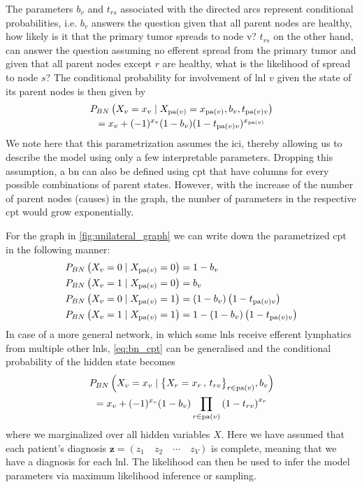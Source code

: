 \documentclass[\relativeRoot/main.tex]{subfiles}
\begin{document}
The parameters $b_v$ and $t_{rs}$   associated with the directed arcs represent conditional probabilities, i.e. $b_v$ answers the question given that all parent nodes are healthy, how likely is it that the primary tumor spreads to node v? $t_{rs}$ on the other hand, can answer the question assuming no efferent spread from the primary tumor and given that all parent nodes except $r$ are healthy, what is the likelihood of spread to node $s$? The conditional probability for involvement of \gls{lnl} $v$ given the state of its parent nodes is then given by
%
\begin{multline}
    P_{BN} \left( X_v = x_v \mid X_{\operatorname{pa}(v)} = x_{\operatorname{pa}(v)}, b_v, t_{\operatorname{pa}(v)v} \right) \\
    = x_v + (-1)^{x_v} (1 - b_v) (1 - t_{\operatorname{pa}(v)v})^{x_{\operatorname{pa}(v)}}
\end{multline}
%
We note here that this parametrization assumes the \gls{ici}, thereby allowing us to describe the model using only a few interpretable parameters. Dropping this assumption, a \gls{bn} can also be defined using \gls{cpt} that have columns for every possible combinations of parent states. However, with the increase of the number of parent nodes (causes) in the graph, the number of parameters in the respective \gls{cpt} would grow exponentially.

For the graph in \cref{fig:unilateral_graph} we can write down the parametrized \gls{cpt} in the following manner:
%
\begin{equation} \label{eq:bn_cpt}
    \begin{aligned}
        P_{BN} \left( X_v = 0 \mid X_{\operatorname{pa}(v)} = 0 \right) &= 1 - b_v \\
        P_{BN} \left( X_v = 1 \mid X_{\operatorname{pa}(v)} = 0 \right) &= b_v \\
        P_{BN} \left( X_v = 0 \mid X_{\operatorname{pa}(v)} = 1 \right) &= (1 - b_v) \left(1 - t_{\operatorname{pa}(v)v}\right) \\
        P_{BN} \left( X_v = 1 \mid X_{\operatorname{pa}(v)} = 1 \right) &= 1 - (1 - b_v) \left(1 - t_{\operatorname{pa}(v)v}\right) 
    \end{aligned}
\end{equation}
%
In case of a more general network, in which some \glspl{lnl} receive efferent lymphatics from multiple other \glspl{lnl}, \cref{eq:bn_cpt} can be generalised and the conditional probability of the hidden state becomes
%
\begin{multline}
    P_{BN} \left( X_v = x_v \mid \big\{ X_r = x_r \,,\, t_{rv} \big\}_{r \in \operatorname{pa}(v)} , b_v \right) \\
    = x_v + (-1)^{x_v} (1 - b_v) \prod_{r \in \operatorname{pa}(v)}{\left( 1 - t_{rv} \right)}^{x_r}
\end{multline}
%
where we marginalized over all hidden variables $X$. Here we have assumed that each patient's diagnosis $\mathbf{z} = \left( z_1 \quad z_2 \quad \cdots \quad z_V \right)$ is complete, meaning that we have a diagnosis for each \gls{lnl}. The likelihood can then be used to infer the model parameters via maximum likelihood inference or sampling.
\end{document}
